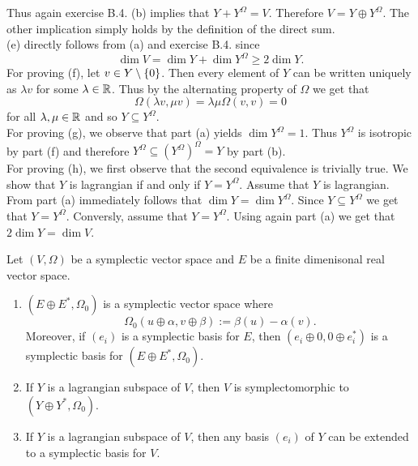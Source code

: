 \begin{solution}
\begin{equation*}
\end{equation*}
Thus again exercise B.4. (b) \cite[620]{lee:smooth_manifolds:2013} implies that $Y + Y^\Omega = V$. Therefore $V = Y \oplus Y^\Omega$. The other implication simply holds by the definition of the direct sum.\\
(e) directly follows from (a) and exercise B.4. \cite[620]{lee:smooth_manifolds:2013} since
\begin{equation*}
\dim V = \dim Y + \dim Y^\Omega \geq 2\dim Y.
\end{equation*}
For proving (f), let $v \in Y \setminus \cbr[0]{0}$. Then every element of $Y$ can be written uniquely as $\lambda v$ for some $\lambda \in \mathbb{R}$. Thus by the alternating property of $\Omega$ we get that
\begin{equation*}
	\Omega(\lambda v,\mu v) = \lambda \mu \Omega(v,v) = 0
\end{equation*}
\noindent for all $\lambda,\mu \in \mathbb{R}$ and so $Y \subseteq Y^\Omega$.\\
For proving (g), we observe that part (a) yields $\dim Y^\Omega = 1$. Thus $Y^\Omega$ is isotropic by part (f) and therefore $Y^\Omega \subseteq (Y^\Omega)^\Omega = Y$ by part (b).\\
For proving (h), we first observe that the second equivalence is trivially true. We show that $Y$ is lagrangian if and only if $Y = Y^\Omega$. Assume that $Y$ is lagrangian. From part (a) immediately follows that $\dim Y = \dim Y^\Omega$. Since $Y \subseteq Y^\Omega$ we get that $Y = Y^\Omega$. Conversly, assume that $Y = Y^\Omega$. Using again part (a) we get that $2\dim Y = \dim V$.
\end{solution}

\begin{exercise}
	Let $(V,\Omega)$ be a symplectic vector space and $E$ be a finite dimenisonal real vector space.
\begin{enumerate}[label = \textup{(}\alph*\textup{)}]
\item $(E \oplus E^*,\Omega_0)$ is a symplectic vector space where 
	\begin{equation}
		\Omega_0(u \oplus \alpha, v \oplus \beta) := \beta(u) - \alpha(v).
	\end{equation}
	Moreover, if $(e_i)$ is a symplectic basis for $E$, then $(e_i \oplus 0, 0 \oplus e_i^*)$ is a symplectic basis for $(E \oplus E^*,\Omega_0)$.
\item If $Y$ is a lagrangian subspace of $V$, then $V$ is symplectomorphic to $(Y \oplus Y^*,\Omega_0)$. 
\item If $Y$ is a lagrangian subspace of $V$, then any basis $(e_i)$ of $Y$ can be extended to a symplectic basis for $V$.
\end{enumerate}
\end{exercise}

